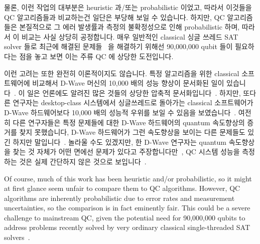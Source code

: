 물론, 이런 작업의 대부분은 heuristic 과/또는 probabilistic 이었고, 따라서
이것들을 QC 알고리즘들과 비교하는건 일단은 부당해 보일 수 있습니다.
하지만, QC 알고리즘들은 본질적으로 그 에러 발생률과 측정의 불확정성으로 인해
probabilistic 하며, 따라서 이 비교는 사실 상당히 공정합니다.
매우 일반적인 classical 싱글 쓰레드 SAT solver 들로 최근에 해결된
문제들~\cite{LihaoLiang2016VerifyTreeRCU} 을 해결하기 위해선 90,000,000 qubit
들이 필요하다는 점을 놓고 보면 이는 주류 QC 에 상당한 도전입니다.

이런 고려는 또한 완전히 이론적이지도 않습니다.
특정 알고리즘을 위한 classical 소프트웨어에 비교해서 D-Wave 머신의 10,000 배의
성능 향상이 문서화된 일이 있습니다~\cite{McGeoch:2013:EEA:2482767.2482797}.
이 일은 언론에도 알려진 많은 것들의 상당한 압축적
문서화입니다~\cite{CharlesChoi2013D-WaveGoogleNASA}.
하지만, 또다른 연구자는 desktop-class 시스템에서 싱글쓰레드로 돌아가는
classical 소프트웨어가 D-Wave 하드웨어보다 10,000 배의 성능적 우위를 보일 수
있음을
보였습니다~\cite{AlexSelby2014D-Wave-vs-classical,AlexSelby2013D-WaveHarderQUBO}.
여전히 다른 연구자들은 특정 문제들에 대한 D-Wave 하드웨어의 quantum 속도향상의
증거를 찾지 못했습니다, D-Wave 하드웨어가 그런 속도향상을 보이는 다른 문제들도
있긴 하지만
말입니다~\cite{AdrianCho2014QC-D-WaveNoSpeedup,TroelsFRonnow2014QC-D-WaveNoSpeedup}.
놀라울 수도 있겠지만, 한 D-Wave 연구자는 quantum 속도향상을 찾는 것 자체가 어떤
면에선 문제가 있다고
주장합니다만~\cite{MohammadHAmin2015QC-D-Wave-QuantumSpeedupProblematic}, QC
시스템 성능을 측정하는 것은 실제 간단하지 않은 것으로
보입니다~\cite{PhysRevLett.118.100601,ArsTechnica2017QC-SpeedTradeoffs}.
\iffalse

Of course, much of this work has been heuristic and/or probabilistic,
so it might at first glance seem unfair to compare them to
QC algorithms.
However, QC algorithms are inherently probabilistic due to error rates
and measurement uncertainties, so the comparison is in fact eminently
fair.
This could be a severe challenge to mainstream QC, given the potential
need for 90,000,000 qubits to address problems recently solved by
very ordinary classical single-threaded SAT
solvers~\cite{LihaoLiang2016VerifyTreeRCU}.

